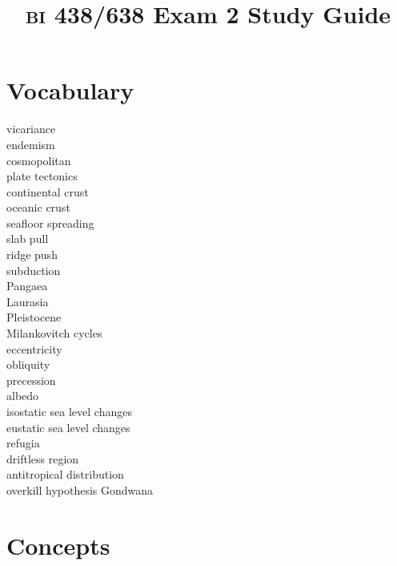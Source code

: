 \documentclass[letterpaper]{tufte-handout}
\title{{\scshape bi} 438/638 Exam 2 Study Guide}
\date{} %
\begin{document}
\maketitle	%

\section*{Vocabulary}

\vspace{-1\baselineskip}
\begin{multicols}{2}
vicariance \\
endemism \\
cosmopolitan \\
plate tectonics \\
continental crust \\
oceanic crust \\
seafloor spreading \\
slab pull \\
ridge push \\
subduction \\
Pangaea \\
Laurasia \\
Pleistocene \\
Milankovitch cycles \\
eccentricity \\
obliquity \\
precession \\
albedo \\
isostatic sea level changes \\
eustatic sea level changes \\
refugia \\
driftless region \\
antitropical distribution \\
overkill hypothesis
Gondwana\end{multicols}

\section*{Concepts}
\end{document}
